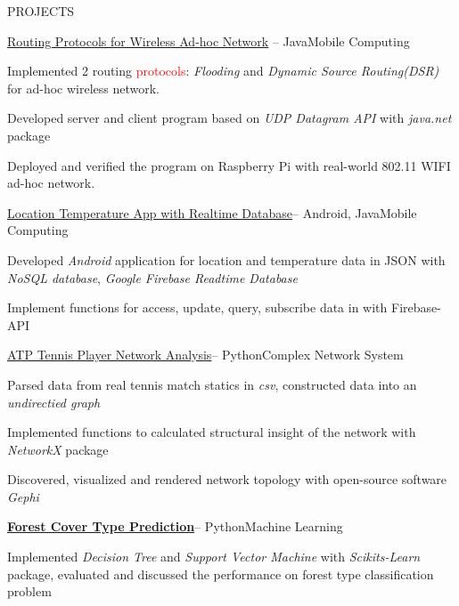 \documentclass{resume} %
\begin{document}
\begin{rSection}{PROJECTS}
\begin{rSubsection}{\href{https://github.com/kuangyu0801/MobileComputing_SS20_assign04}{Routing Protocols for Wireless Ad-hoc Network}} { -- Java}{Mobile Computing}{} \\
\item Implemented 2 routing \textcolor{red}{protocols}: {\em Flooding} and {\em Dynamic Source Routing(DSR)} for ad-hoc wireless network. 
\item Developed server and client program based on {\em UDP Datagram API} with {\em java.net} package
\item Deployed and verified the program on Raspberry Pi with real-world 802.11 WIFI ad-hoc network.
\end{rSubsection}
\begin{rSubsection}{\href{https://github.com/kuangyu0801/MobileComputing_SS20_assign03}{Location Temperature App with Realtime Database}}{-- Android, Java}{Mobile Computing}{} \\
\item Developed {\em Android} application for location and temperature data in JSON with {\em NoSQL database}, {\em Google Firebase Readtime Database}
\item Implement functions for access, update, query, subscribe data in  with Firebase-API
\end{rSubsection}
\begin{rSubsection}{\href{https://github.com/kuangyu0801/WS19_ComplexNetworkSystem}{ATP Tennis Player Network Analysis}}{-- Python}{Complex Network System}{} \\

\item Parsed data  from real tennis match statics in {\em csv}, constructed data into an {\em undirectied graph}
\item Implemented functions to calculated structural insight of the network with {\em NetworkX} package
\item Discovered, visualized and rendered network topology with open-source software {\em Gephi}
\end{rSubsection}

\begin{rSubsection}{\bf \href{https://1drv.ms/p/s!AiukWIzY5GZp22FjndnKscnEaL85?e=F2UJEL}{Forest Cover Type Prediction}}{-- Python}{Machine Learning}{}
\item Implemented {\em Decision Tree} and {\em Support Vector Machine} with {\em Scikits-Learn} package, evaluated and discussed the performance on forest type classification problem 

\end{rSubsection}

\end{rSection}
\end{document}
